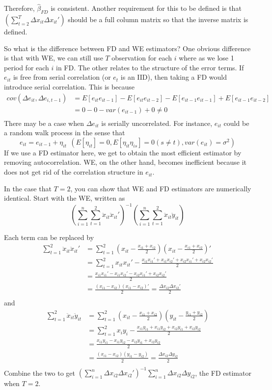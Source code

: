 \documentclass[12pt]{article}
\theoremstyle{definition}
\theoremstyle{property}
\theoremstyle{assumption}
\theoremstyle{example}
\theoremstyle{comment}
\begin{document}
Therefore, $\hat{\beta}_{FD}$ is consistent. Another requirement for this to be defined is that $\left(\sum_{t=2}^T \Delta x_{it}\Delta x_{it}'\right)$ should be a full column matrix so that the inverse matrix is defined. 
\par
So what is the difference between FD and WE estimators? One obvious difference is that with WE, we can still use $T$ observation for each $i$ where as we lose 1 period for each $i$ in FD. The other relates to the structure of the error terms. If $e_{it}$ is free from serial correlation (or $e_t$ is an IID), then taking a FD would introduce serial correlation. This is because
\[
\begin{aligned}
cov(\Delta e_{it},\Delta e_{i,t-1})&=E[e_{it}e_{it-1}]-E[e_{it}e_{it-2}]-E[e_{it-1}e_{it-1}]+E[e_{it-1}e_{it-2}]\\
&=0-0-var(e_{it-1})+0\neq 0 \\
\end{aligned}
\]
There may be a case when $\Delta e_{it}$ is serially uncorrelated. For instance, $e_{it}$ could be a random walk process in the sense that
\[
e_{it}=e_{it-1}+\eta_{it} \ \ (E[\eta_{it}]=0, E[\eta_{it}\eta_{is}]=0 (s\neq t), var(e_{it})=\sigma^2)
\]
If we use a FD estimator here, we get to obtain the most efficient estimator by removing autocorrelation. WE, on the other hand, becomes inefficient because it does not get rid of the correlation structure in $e_{it}$. 
\par
In the case that $T=2$, you can show that WE and FD estimators are numerically identical.  Start with the WE, written as
\[
\left(\sum_{i=1}^n\sum_{t=1}^2\ddot{x}_{it}\ddot{x}_{it}' \right)^{-1}\left(\sum_{i=1}^n\sum_{t=1}^2\ddot{x}_{it}\ddot{y}_{it} \right)
\]\par
Each term can be replaced by
\[
\begin{aligned}
\sum_{t=1}^2\ddot{x}_{it}\ddot{x}_{it}'&=\sum_{t=1}^2\left(x_{it}-\frac{x_{i1}+x_{i2}}{2}\right)\left(x_{it}-\frac{x_{i1}+x_{i2}}{2}\right)'\\
&=\sum_{t=1}^2x_{it}x_{it}'-\frac{x_{i1}x_{i1}'+x_{i1}x_{i2}'+x_{i2}x_{i1}'+x_{i2}x_{i2}'}{2}\\
&=\frac{x_{i1}x_{i1}'-x_{i1}x_{i2}'-x_{i2}x_{i1}'+x_{i2}x_{i2}'}{2}\\
&=\frac{(x_{i1}-x_{i2})(x_{i1}-x_{i2})'}{2}=\frac{\Delta x_{i2} \Delta x_{i2}'}{2}\\
\end{aligned}
\]
and 
\[
\begin{aligned}
\sum_{t=1}^2\ddot{x}_{it}\ddot{y}_{it}&=\sum_{t=1}^2\left(x_{it}-\frac{x_{i1}+x_{i2}}{2}\right)\left(y_{it}-\frac{y_{i1}+y_{i2}}{2}\right)\\
&=\sum_{t=1}^2 x_iy_i - \frac{x_{i1}y_{i1}+x_{i1}y_{i2}+x_{i2}y_{i1}+x_{i2}y_{i2}}{2}\\
&=\frac{x_{i1}y_{i1}-x_{i1}y_{i2}-x_{i2}y_{i1}+x_{i2}y_{i2}}{2}\\
&=\frac{(x_{i1}-x_{i2})(y_{i1}-y_{i2})}{2}=\frac{\Delta x_{i2} \Delta y_{i2}}{2}\\
\end{aligned}
\]
Combine the two to get $\left(\sum_{i=1}^n \Delta x_{i2}\Delta x_{i2}'\right)^{-1}\sum_{i=1}^n \Delta x_{i2}\Delta y_{i2}$, the FD estimator when $T=2$. 
\end{document}
